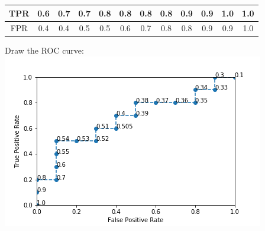 \documentclass{article}
\begin{document}
\begin{center}
    \begin{tabular}{| c | c | c | c | c | c | c | c | c | c | c | c |} 
    \hline
    TPR &0.6 &0.7 &0.7 &0.8 &0.8 &0.8 &0.8 &0.9 &0.9 &1.0 &1.0 \\ 
    \hline
    FPR &0.4 &0.4 &0.5 &0.5 &0.6 &0.7 &0.8 &0.8 &0.9 &0.9 &1.0 \\ 
    \hline
    \end{tabular}
\end{center}

\noindent Draw the ROC curve: \\
\includegraphics{ROC.png}
 
\end{document}
